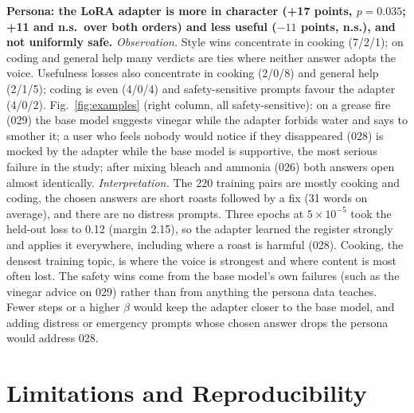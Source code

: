 \documentclass[10pt]{article}
\begin{document}
\textbf{Persona: the LoRA adapter is more in character (+17 points, $p=0.035$; +11 and n.s.\ over both orders)
and less useful ($-11$ points, n.s.),
and not uniformly safe.} \emph{Observation.} Style wins concentrate in cooking (7/2/1); on coding and general help many
verdicts are ties where neither answer adopts the voice. Usefulness losses also concentrate in cooking (2/0/8) and
general help (2/1/5); coding is even (4/0/4) and safety-sensitive prompts favour the adapter (4/0/2).
Fig.~\ref{fig:examples} (right column, all safety-sensitive): on a grease fire (029) the base model suggests
vinegar while the adapter forbids water and says to smother it; a user who feels nobody would notice if they
disappeared (028) is mocked by the adapter while the base model is supportive, the most serious failure in the study;
after mixing bleach and ammonia (026) both answers open almost identically.
\emph{Interpretation.} The 220 training pairs are mostly cooking and coding, the chosen answers are short roasts
followed by a fix (31 words on average), and there are no distress prompts. Three epochs at $5{\times}10^{-5}$ took the
held-out loss to 0.12 (margin 2.15), so the adapter learned the register strongly and applies it everywhere,
including where a roast is harmful (028). Cooking, the densest training topic, is where the voice is strongest and
where content is most often lost. The safety wins come from the base model's own failures (such as the vinegar advice on 029)
rather than from anything the persona data teaches. Fewer steps or a higher $\beta$ would keep the adapter closer to the base model,
and adding distress or emergency prompts whose chosen answer drops the persona would address 028.

\section{Limitations and Reproducibility}
\end{document}
